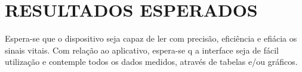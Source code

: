\section{RESULTADOS ESPERADOS}

Espera-se que o dispositivo seja capaz de ler com precisão, eficiência e efiácia os sinais vitais. Com relação ao aplicativo, espera-se q a interface seja de fácil utilização e contemple todos os dados medidos, através de tabelas e/ou gráficos.






